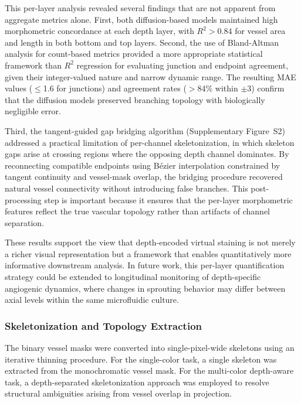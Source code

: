 This per-layer analysis revealed several findings that are not apparent from aggregate metrics alone. First, both diffusion-based models maintained high morphometric concordance at each depth layer, with $R^2 > 0.84$ for vessel area and length in both bottom and top layers. Second, the use of Bland-Altman analysis for count-based metrics provided a more appropriate statistical framework than $R^2$ regression for evaluating junction and endpoint agreement, given their integer-valued nature and narrow dynamic range. The resulting MAE values ($\leq$1.6 for junctions) and agreement rates ($>$84\% within $\pm$3) confirm that the diffusion models preserved branching topology with biologically negligible error.

Third, the tangent-guided gap bridging algorithm (Supplementary Figure~S2) addressed a practical limitation of per-channel skeletonization, in which skeleton gaps arise at crossing regions where the opposing depth channel dominates. By reconnecting compatible endpoints using B\'{e}zier interpolation constrained by tangent continuity and vessel-mask overlap, the bridging procedure recovered natural vessel connectivity without introducing false branches. This post-processing step is important because it ensures that the per-layer morphometric features reflect the true vascular topology rather than artifacts of channel separation.

These results support the view that depth-encoded virtual staining is not merely a richer visual representation but a framework that enables quantitatively more informative downstream analysis. In future work, this per-layer quantification strategy could be extended to longitudinal monitoring of depth-specific angiogenic dynamics, where changes in sprouting behavior may differ between axial levels within the same microfluidic culture.



\subsubsection{Skeletonization and Topology Extraction}
The binary vessel masks were converted into single-pixel-wide skeletons using an iterative thinning procedure. For the single-color task, a single skeleton was extracted from the monochromatic vessel mask. For the multi-color depth-aware task, a depth-separated skeletonization approach was employed to resolve structural ambiguities arising from vessel overlap in projection.

